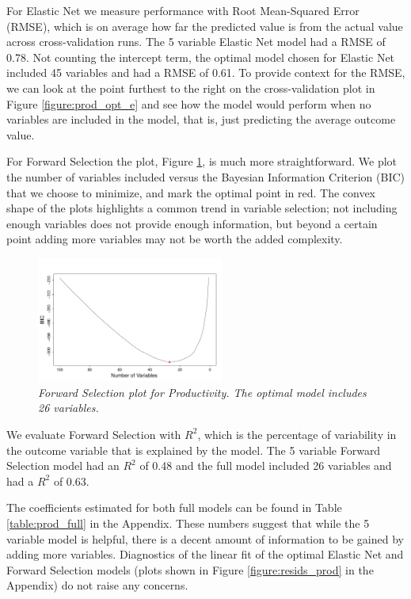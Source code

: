 \documentclass{article}
\begin{document}
For Elastic Net we measure performance with Root Mean-Squared Error (RMSE), which is on average how far the predicted 
value is from the actual value across cross-validation runs. The 5 variable Elastic Net model had a RMSE of 0.78. Not counting 
the intercept term, the optimal model chosen for Elastic Net included 45 variables and had a RMSE of 0.61. To provide context 
for the RMSE, we can look at the point furthest to the right on the cross-validation plot in Figure \ref{figure:prod_opt_e} and see 
how the model would perform when no variables are included in the model, that is, just predicting the average outcome value.

For Forward Selection the plot, Figure \ref{figure:prod_opt_f}, is much more straightforward. We plot the number of variables 
included versus the Bayesian Information Criterion (BIC) that we choose to minimize, and mark the optimal point in red. The 
convex shape of the plots highlights a common trend in variable selection; not including enough variables does not provide 
enough information, but beyond a certain point adding more variables may not be worth the added complexity. 


\begin{figure}
\vspace*{-0.5cm}
\includegraphics[width=0.55\textwidth]{forward_nvars_production.pdf}
\setlength{\abovecaptionskip}{0pt}
\setlength{\belowcaptionskip}{-20pt}
\caption{\textsl{\small Forward Selection plot for Productivity. The optimal model includes 26 variables.}}
\label{figure:prod_opt_f}
\end{figure}



We evaluate Forward Selection with $R^2$, which is the percentage of variability in the outcome variable that is explained by 
the model. The 5 variable Forward Selection model had an $R^2$ of 0.48 and the full model included 26 variables and had a 
$R^2$ of 0.63. 

The coefficients estimated for both full models can be found in Table \ref{table:prod_full} in the Appendix. These numbers 
suggest that while the 5 variable model is helpful, there is a decent amount of information to be 
gained by adding more variables. Diagnostics of the linear fit of the optimal Elastic Net and Forward Selection models (plots 
shown in Figure \ref{figure:resids_prod} in the Appendix) do not raise any concerns. 
\end{document}
